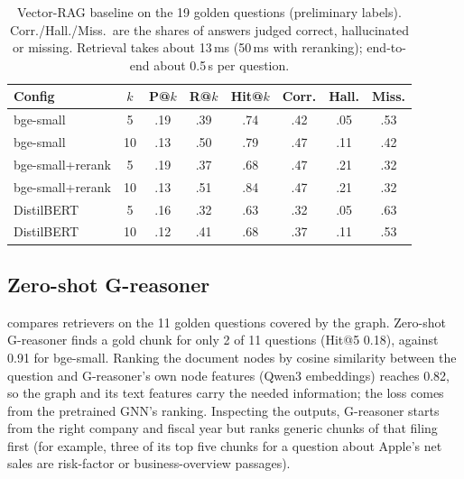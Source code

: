 \documentclass[10pt,twocolumn,letterpaper]{article}
\begin{document}
\begin{table}[t]
  \centering
  \footnotesize
  \setlength{\tabcolsep}{3pt}
  \begin{tabular}{@{}lc ccc ccc@{}}
    \toprule
    Config & $k$ & P@$k$ & R@$k$ & Hit@$k$ & Corr. & Hall. & Miss. \\
    \midrule
    bge-small          & 5  & .19 & .39 & .74 & .42 & .05 & .53 \\
    bge-small          & 10 & .13 & .50 & .79 & .47 & .11 & .42 \\
    bge-small+rerank & 5  & .19 & .37 & .68 & .47 & .21 & .32 \\
    bge-small+rerank & 10 & .13 & .51 & .84 & .47 & .21 & .32 \\
    DistilBERT         & 5  & .16 & .32 & .63 & .32 & .05 & .63 \\
    DistilBERT         & 10 & .12 & .41 & .68 & .37 & .11 & .53 \\
    \bottomrule
  \end{tabular}
  \caption{Vector-RAG baseline on the 19 golden questions (preliminary labels). Corr./Hall./Miss.\
  are the shares of answers judged correct, hallucinated or missing. Retrieval takes about 13\,ms
  (50\,ms with reranking); end-to-end about 0.5\,s per question.}
  \label{tab:baseline}
\end{table}

\subsection{Zero-shot G-reasoner}
\label{sec:exp-greasoner}
 compares retrievers on the 11 golden questions covered by the graph.
Zero-shot G-reasoner finds a gold chunk for only 2 of 11 questions (Hit@5 0.18), against 0.91 for
bge-small. Ranking the document nodes by cosine similarity between the question and G-reasoner's own node
features (Qwen3 embeddings) reaches 0.82, so the graph and its text features carry the needed
information; the loss comes from the pretrained GNN's ranking. Inspecting the outputs, G-reasoner
starts from the right company and fiscal year but ranks generic chunks of that filing first (for
example, three of its top five chunks for a question about Apple's net sales are risk-factor or
business-overview passages).
\end{document}
